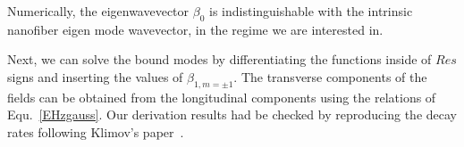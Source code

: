 Numerically, the eigenwavevector $ \beta_0 $ is indistinguishable with the intrinsic nanofiber eigen mode wavevector, in the regime we are interested in.

Next, we can solve the bound modes by differentiating the functions inside of $ Res $ signs and inserting the values of $ \beta_{1,m=\pm 1} $. %
The transverse components of the fields can be obtained from the longitudinal components using the relations of Equ.~\ref{EHzgauss}. 
Our derivation results had be checked by reproducing the decay rates following Klimov's paper~\cite{Klimov2004}. 

